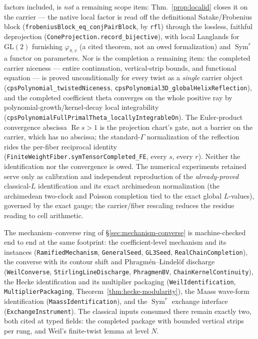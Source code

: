 \documentclass[11pt]{article}
\theoremstyle{definition}
\renewcommand{\Re}{\operatorname{Re}}
\newcommand{\Sym}{\operatorname{Sym}}
\begin{document}
factors included, is \emph{not} a remaining scope item: Thm.~\ref{prop:localid} closes it on the
carrier --- the native local factor is read off the definitional Satake/Frobenius block
(\texttt{frobeniusBlock\_eq\_conjPairBlock}, by \texttt{rfl}) through the lossless, faithful deprojection
(\texttt{ConeProjection.record\_bijective}), with local Langlands for $\mathrm{GL}(2)$ \cite{Tate}
furnishing $\varphi_{\pi,v}$ (a cited theorem, not an owed formalization) and $\Sym^r$ a functor on
parameters.  Nor is the completion a remaining item: the completed carrier niceness --- entire
continuation, vertical-strip bounds, and functional equation --- is proved unconditionally for every
twist as a \emph{single} carrier object (\texttt{cpsPolynomial\_twistedNiceness},
\texttt{cpsPolynomial3D\_globalHelixReflection}), and the completed coefficient theta converges on the
whole positive ray by polynomial-growth/kernel-decay local integrability
(\texttt{cpsPolynomialFullPrimalTheta\_locallyIntegrableOn}).  The Euler-product convergence abscissa
$\Re s>1$ is the projection chart's gate, not a barrier on the carrier, which has no abscissa; the
standard-$\Gamma$ normalization of the reflection rides the per-fiber reciprocal identity
(\texttt{FiniteWeightFiber.symTensorCompleted\_FE}, every $s$, every $r$).  Neither the identification
nor the convergence is owed.
The numerical experiments retained serve only as calibration and independent reproduction
of the \emph{already-proved} classical-$L$ identification and its exact archimedean normalization (the archimedean
two-clock and Poisson completion tied to the exact global $L$-values), governed by the exact gauge; the
carrier/fiber rescaling reduces the residue reading to cell arithmetic.

The mechanism--converse ring of \S\ref{sec:mechanism-converse} is machine-checked end
to end at the same footprint: the coefficient-level mechanism and its instances
(\texttt{RamifiedMechanism}, \texttt{GeneralSeed}, \texttt{GL3Seed},
\texttt{RealChainCompletion}), the converse with its contour shift and
Phragm\'en--Lindel\"of discharge (\texttt{WeilConverse},
\texttt{StirlingLineDischarge}, \texttt{PhragmenBV},
\texttt{ChainKernelContinuity}), the Hecke identification and its multiplier
packaging (\texttt{WeilIdentification}, \texttt{MultiplierPackaging},
Theorem~\ref{thm:hecke-modularity}), the Maass wave-form identification
(\texttt{MaassIdentification}), and the $\Sym^r$ exchange interface
(\texttt{ExchangeInstrument}).  The classical inputs consumed there remain exactly
two, both cited at typed fields: the completed package with bounded vertical strips
per rung, and Weil's finite-twist lemma at level $N$.
\end{document}
